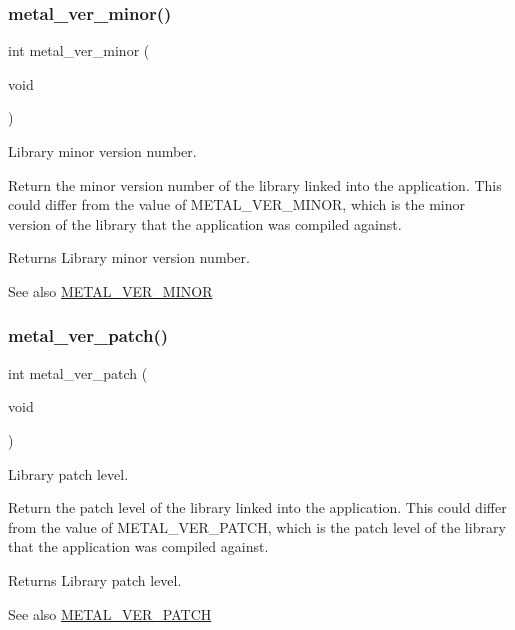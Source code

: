 \subsubsection{\texorpdfstring{metal\+\_\+ver\+\_\+minor()}{metal\_ver\_minor()}}
{\footnotesize\ttfamily int metal\+\_\+ver\+\_\+minor (\begin{DoxyParamCaption}\item[{void}]{ }\end{DoxyParamCaption})}



Library minor version number. 

Return the minor version number of the library linked into the application. This could differ from the value of M\+E\+T\+A\+L\+\_\+\+V\+E\+R\+\_\+\+M\+I\+N\+OR, which is the minor version of the library that the application was compiled against.

\begin{DoxyReturn}{Returns}
Library minor version number. 
\end{DoxyReturn}
\begin{DoxySeeAlso}{See also}
\hyperlink{config_8h_a85f235a417f708104d7640cf51343b4b}{M\+E\+T\+A\+L\+\_\+\+V\+E\+R\+\_\+\+M\+I\+N\+OR} 
\end{DoxySeeAlso}
\mbox{\label{group__versions_ga2cc6ecf158e53a9b985b8d0933ebdaa8}} 
\subsubsection{\texorpdfstring{metal\+\_\+ver\+\_\+patch()}{metal\_ver\_patch()}}
{\footnotesize\ttfamily int metal\+\_\+ver\+\_\+patch (\begin{DoxyParamCaption}\item[{void}]{ }\end{DoxyParamCaption})}



Library patch level. 

Return the patch level of the library linked into the application. This could differ from the value of M\+E\+T\+A\+L\+\_\+\+V\+E\+R\+\_\+\+P\+A\+T\+CH, which is the patch level of the library that the application was compiled against.

\begin{DoxyReturn}{Returns}
Library patch level. 
\end{DoxyReturn}
\begin{DoxySeeAlso}{See also}
\hyperlink{config_8h_a85fa822155cfd8193cfe84737a06abc4}{M\+E\+T\+A\+L\+\_\+\+V\+E\+R\+\_\+\+P\+A\+T\+CH} 
\end{DoxySeeAlso}
